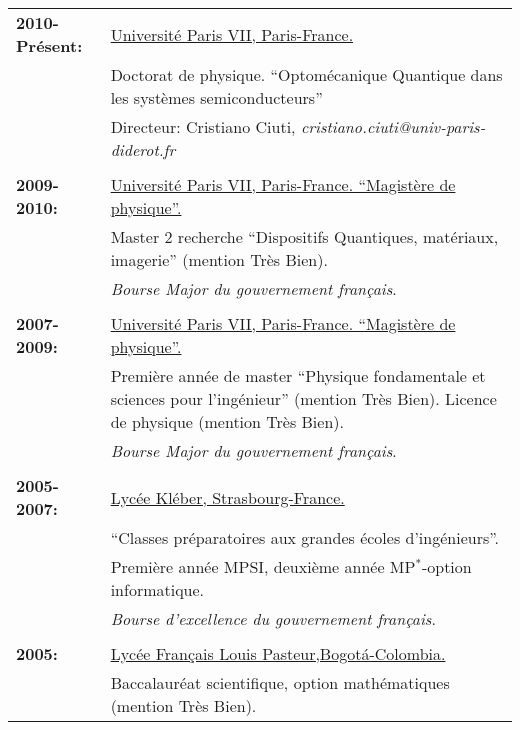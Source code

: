 \documentclass[10pt]{article}
\begin{document}
 		\begin{tabular}[l]{p{4cm} p{11cm}}
 
                                      \textbf{2010-Pr\'esent:}& \underline{Universit\'e Paris VII, Paris-France.}\\
				                               {}& Doctorat de physique. ``Optom\'ecanique Quantique dans les syst\`emes semiconducteurs''\\
				                               {}&Directeur: Cristiano Ciuti, \textit{cristiano.ciuti@univ-paris-diderot.fr}\\
				                               {}&\\
				                               
				
 				\textbf{2009-2010:}& \underline{Universit\'e Paris VII, Paris-France. ``Magist\`ere de physique''.}\\
				                               {}& Master 2 recherche ``Dispositifs Quantiques, mat\'eriaux, imagerie'' (mention Tr\`es Bien).\\
				                               {}& \emph{Bourse Major du gouvernement fran\c cais}.\\
				                               {}&\\
				                               
 				\textbf{2007-2009:}& \underline{Universit\'e Paris VII, Paris-France. ``Magist\`ere de physique''.}\\
 							        {}& Premi\`ere ann\'ee de master ``Physique fondamentale et sciences pour l'ing\'enieur'' (mention Tr\`es Bien). Licence de physique (mention Tr\`es Bien).\\
							        {} & \emph{Bourse Major du gouvernement fran\c cais}.\\
 							        {}&\\
 							

 				
 			        \textbf{2005-2007:}&\underline{	Lyc\'ee Kl\'eber, Strasbourg-France.}\\
 		 					  {}& ``Classes pr\'eparatoires aux grandes \'ecoles d'ing\'enieurs''.\\
 		 					  {}&	Premi\`ere ann\'ee MPSI, deuxi\`eme ann\'ee MP$^*$-option informatique.\\
							  {}& \emph{Bourse d'excellence du gouvernement fran\c cais}.\\
							  {}&\\ 		 			

 
 			       \textbf{2005:}    &	 \underline{Lyc\'ee Fran\c cais Louis Pasteur,Bogot\'a-Colombia.}\\
 			  		             {}&	 Baccalaur\'eat scientifique, option math\'ematiques (mention Tr\`es Bien).\\
 												
 			\end{tabular}
 			
\end{document}
